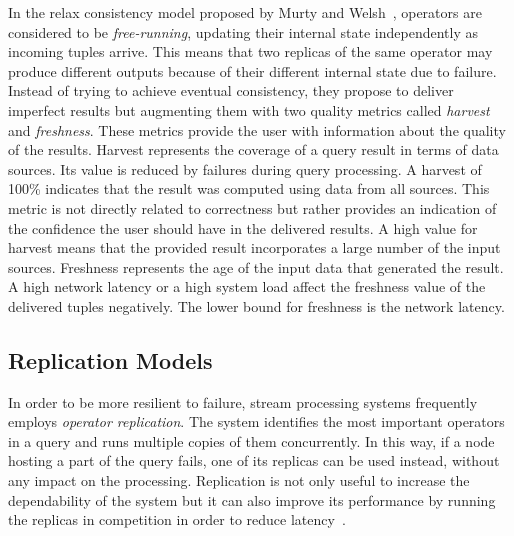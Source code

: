 In the relax consistency model proposed by Murty and Welsh~\cite{dependable-is-sensing}, operators are
considered to be \emph{free-running}, updating their internal state independently as incoming tuples
arrive. This means that two replicas of the same operator may produce different outputs because of their
different internal state due to failure.
Instead of trying to achieve eventual consistency, they propose to
deliver imperfect results but augmenting them with two quality metrics called \emph{harvest} and
\emph{freshness}. These metrics provide the user with information about the quality of the results.
Harvest represents the coverage of a query result in terms of data sources. Its value is reduced by
failures during query processing. A harvest of 100\% indicates that the result was computed
using data from all sources.
This metric is not directly related to correctness but rather provides an indication of
the confidence the user should have in the delivered results. A high value for harvest means that
the provided result incorporates a large number of the input sources.
Freshness represents the age of the input data that generated the result. A high network latency or a
high system load affect the freshness value of the delivered tuples negatively. The lower bound for
freshness is the network latency.

	
\subsection*{Replication Models}

In order to be more resilient to failure, stream processing systems frequently employs \emph{operator
replication}.
The system identifies the most important operators in a query and runs multiple copies of them
concurrently.
In this way, if a node hosting a part of the query fails, one of its replicas can be used instead,
without any impact on the processing.
Replication is not only useful to increase the dependability of the system but it can also improve its
performance by running the replicas in competition in order to reduce
latency~\cite{borealis-fast_and_ha, borealis-fast_and_reliable}.


